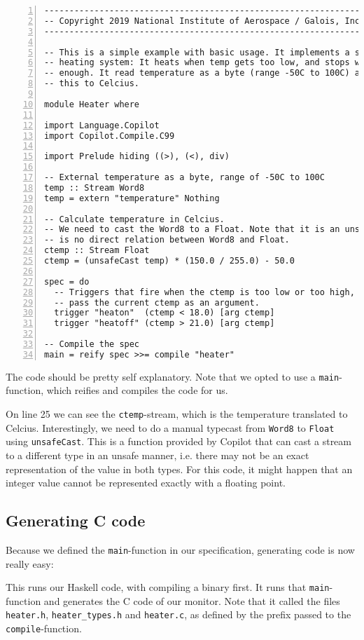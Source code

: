 \begin{lstlisting}[language = Copilot, frame = single, numbers = left]
--------------------------------------------------------------------------------
-- Copyright 2019 National Institute of Aerospace / Galois, Inc.
--------------------------------------------------------------------------------

-- This is a simple example with basic usage. It implements a simple home
-- heating system: It heats when temp gets too low, and stops when it is high
-- enough. It read temperature as a byte (range -50C to 100C) and translates
-- this to Celcius.

module Heater where

import Language.Copilot
import Copilot.Compile.C99

import Prelude hiding ((>), (<), div)

-- External temperature as a byte, range of -50C to 100C
temp :: Stream Word8
temp = extern "temperature" Nothing

-- Calculate temperature in Celcius.
-- We need to cast the Word8 to a Float. Note that it is an unsafeCast, as there
-- is no direct relation between Word8 and Float.
ctemp :: Stream Float
ctemp = (unsafeCast temp) * (150.0 / 255.0) - 50.0

spec = do
  -- Triggers that fire when the ctemp is too low or too high,
  -- pass the current ctemp as an argument.
  trigger "heaton"  (ctemp < 18.0) [arg ctemp]
  trigger "heatoff" (ctemp > 21.0) [arg ctemp]

-- Compile the spec
main = reify spec >>= compile "heater"
\end{lstlisting}
The code should be pretty self explanatory. Note that we opted to use a
\texttt{main}-function, which reifies and compiles the code for us.

On line 25 we can see the \texttt{ctemp}-stream, which is the temperature
translated to Celcius. Interestingly, we need to do a manual typecast from
\texttt{Word8} to \texttt{Float} using \texttt{unsafeCast}. This is a function
provided by Copilot that can cast a stream to a different type in an unsafe
manner, i.e. there may not be an exact representation of the value in both
types. For this code, it might happen that an integer value cannot be
represented exactly with a floating point.

\subsection{Generating C code}
Because we defined the \texttt{main}-function in our specification, generating
code is now really easy:
This runs our Haskell code, with compiling a binary first. It runs that
\texttt{main}-function and generates the C code of our monitor. Note that it
called the files \texttt{heater.h}, \texttt{heater\_types.h} and \texttt{heater.c}, as defined by the
prefix passed to the \texttt{compile}-function.

